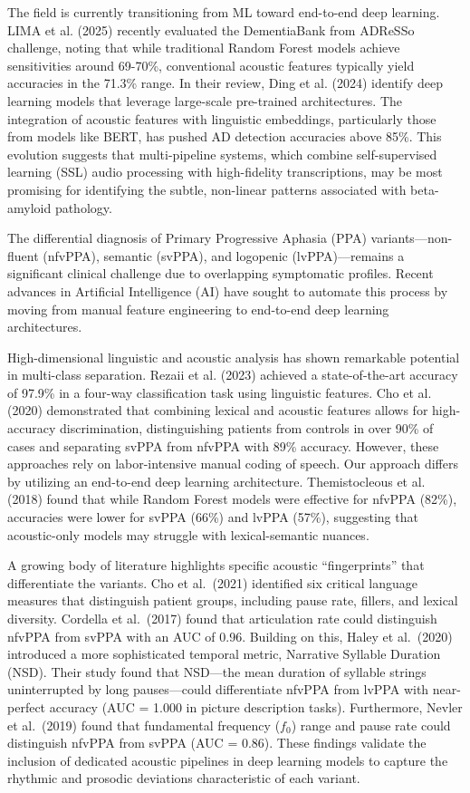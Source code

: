 \documentclass{Odyssey2026}
\begin{document}
The field is currently transitioning from ML toward end-to-end deep learning. LIMA et al. (2025) recently evaluated the DementiaBank from ADReSSo challenge, noting that while traditional Random Forest models achieve sensitivities around 69-70\%, conventional acoustic features typically yield accuracies in the 71.3\% range. In their review, Ding et al. (2024) identify deep learning models that leverage large-scale pre-trained architectures. The integration of acoustic features with linguistic embeddings, particularly those from models like BERT, has pushed AD detection accuracies above 85\%. This evolution suggests that multi-pipeline systems, which combine self-supervised learning (SSL) audio processing with high-fidelity transcriptions, may be most promising for identifying the subtle, non-linear patterns associated with beta-amyloid pathology.

The differential diagnosis of Primary Progressive Aphasia (PPA) variants—non-fluent (nfvPPA), semantic (svPPA), and logopenic (lvPPA)—remains a significant clinical challenge due to overlapping symptomatic profiles. Recent advances in Artificial Intelligence (AI) have sought to automate this process by moving from manual feature engineering to end-to-end deep learning architectures.

High-dimensional linguistic and acoustic analysis has shown remarkable potential in multi-class separation. Rezaii et al. (2023) achieved a state-of-the-art accuracy of 97.9\% in a four-way classification task using linguistic features. Cho et al. (2020) demonstrated that combining lexical and acoustic features allows for high-accuracy discrimination, distinguishing patients from controls in over 90\% of cases and separating svPPA from nfvPPA with 89\% accuracy. However, these approaches rely on labor-intensive manual coding of speech. Our approach differs by utilizing an end-to-end deep learning architecture. Themistocleous et al. (2018) found that while Random Forest models were effective for nfvPPA (82\%), accuracies were lower for svPPA (66\%) and lvPPA (57\%), suggesting that acoustic-only models may struggle with lexical-semantic nuances.

A growing body of literature highlights specific acoustic ``fingerprints'' that differentiate the variants. Cho et al.\ (2021) identified six critical language measures that distinguish patient groups, including pause rate, fillers, and lexical diversity. Cordella et al.\ (2017) found that articulation rate could distinguish nfvPPA from svPPA with an AUC of 0.96. Building on this, Haley et al.\ (2020) introduced a more sophisticated temporal metric, Narrative Syllable Duration (NSD). Their study found that NSD---the mean duration of syllable strings uninterrupted by long pauses---could differentiate nfvPPA from lvPPA with near-perfect accuracy (AUC = 1.000 in picture description tasks). Furthermore, Nevler et al.\ (2019) found that fundamental frequency ($f_0$) range and pause rate could distinguish nfvPPA from svPPA (AUC = 0.86). These findings validate the inclusion of dedicated acoustic pipelines in deep learning models to capture the rhythmic and prosodic deviations characteristic of each variant.
\end{document}
